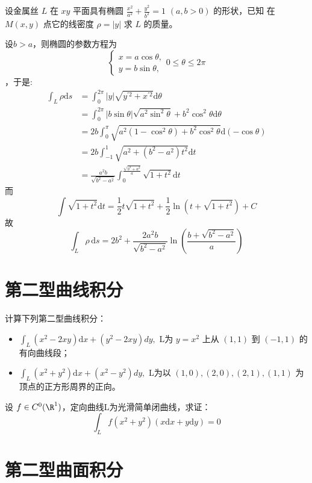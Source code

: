 \begin{problem}
    设金属丝 \(L\) 在 \(xy\) 平面具有椭圆 \(\frac{x^2}{a^2} + \frac{y^2}{b^2} =
    1\) \((a, b > 0)\) 的形状，已知
    在 \(M(x, y)\) 点它的线密度 \(\rho = |y|\) 求 \(L\) 的质量。
\end{problem}

\begin{solution}
    设\(b>a\)，则椭圆的参数方程为 \[
        \begin{cases}
            x = a\cos\theta, \\
            y = b\sin\theta,
        \end{cases} 0\leq\theta\leq2\pi
    \]，于是:
    \begin{align*}
        \int_{L} \rho \mathrm{d}s &= \int_{0}^{2\pi} \left| y \right|
        \sqrt{y^{'2}+x^{'2}} \mathrm{d}\theta\\
        &=\int_{0}^{2\pi} \left| b\sin\theta \right|
        \sqrt{a^{2}\sin^{2}\theta}+b^{2}\cos^{2}\theta
        \mathrm{d}\theta \\
        &= 2b  \int_{0}^{\pi} \sqrt{a^{2}\left( 1-\cos^{2}\theta
        \right) + b^{2}\cos^{2}\theta } \mathrm{d}(-\cos\theta) \\
        &= 2b \int_{-1}^{1} \sqrt{a^{2}+\left( b^{2}-a^{2}
        \right)t^{2}} \mathrm{d}t\\
        &= \frac{a^{2}b}{\sqrt{b^{2}-a^{2}}}
        \int_{0}^{\frac{\sqrt{b^{2}+a^{2}}}{a}}
        \sqrt{1+t^{2}} \mathrm{d}t
    \end{align*}
    而\[
        \int \sqrt{1+t^{2}} \mathrm{d}t = \frac{1}{2}t\sqrt{1+t^{2}} +
        \frac{1}{2}\ln\left( t+\sqrt{1+t^{2}} \right) + C
    \]
    故\[
        \int_{L} \rho \, \mathrm{d}s =
        2b^{2}+\frac{2a^{2}b}{\sqrt{b^{2}-a^{2}}}\ln\left(
        \frac{b+\sqrt{b^{2}-a^{2}}}{a} \right)
    \]
\end{solution}
\section{第二型曲线积分}
\begin{problem}
    计算下列第二型曲线积分：
    \begin{itemize}
        \item \(\int_L (x^2 - 2xy) \mathrm{d}x + (y^2 -
            2xy) dy, \) L为 \(y =
            x^2\) 上从 \((1, 1)\) 到 \((-1, 1)\) 的有向曲线段；
        \item \( \int_L (x^2 + y^2) \mathrm{d}x + (x^2 -
            y^2) dy, \) L为以 \((1, 0), (2, 0), (2, 1),
            (1, 1)\) 为顶点的正方形周界的正向。
    \end{itemize}
\end{problem}

\begin{problem}
    设 \(f \in C^0(\R^1)\)，定向曲线L为光滑简单闭曲线，求证：
    \[
        \int_L f(x^2 + y^2)(x \mathrm{d}x + y \mathrm{d}y) = 0
    \]
\end{problem}

\section{第二型曲面积分}
